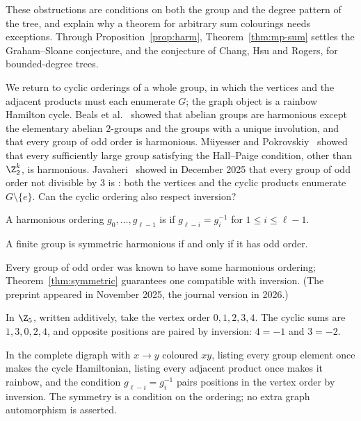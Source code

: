 These obstructions are conditions on both the group and the degree pattern of the tree, and explain why a theorem for arbitrary sum colourings needs exceptions. Through Proposition~\ref{prop:harm}, Theorem~\ref{thm:mp-sum} settles the Graham--Sloane conjecture, and the conjecture of Chang, Hsu and Rogers, for bounded-degree trees.


We return to cyclic orderings of a whole group, in which the vertices and the adjacent products must each enumerate $G$; the graph object is a rainbow Hamilton cycle. Beals et al.~\cite{bghj91} showed that abelian groups are harmonious except the elementary abelian $2$-groups and the groups with a unique involution, and that every group of odd order is harmonious. M\"uyesser and Pokrovskiy~\cite{mp22} showed that every sufficiently large group satisfying the Hall--Paige condition, other than $\Z_2^k$, is harmonious. Javaheri~\cite{jav25} showed in December 2025 that every group of odd order not divisible by $3$ is : both the vertices and the cyclic products enumerate $G\setminus\{e\}$. Can the cyclic ordering also respect inversion?

\begin{definition}\label{def:symmetric}
A harmonious ordering $g_0,\dots,g_{\ell-1}$ is  if $g_{\ell-i}=g_i^{-1}$ for $1\leq i\leq\ell-1$.
\end{definition}

\begin{theorem}\label{thm:symmetric}
A finite group is symmetric harmonious if and only if it has odd order.
\end{theorem}

Every group of odd order was known to have some harmonious ordering; Theorem~\ref{thm:symmetric} guarantees one compatible with inversion. (The preprint appeared in November 2025, the journal version in 2026.)

\begin{example}\label{ex:z5-symmetric}
In $\Z_5$, written additively, take the vertex order $0,1,2,3,4$. The cyclic sums are $1,3,0,2,4$, and opposite positions are paired by inversion: $4=-1$ and $3=-2$.
\end{example}

In the complete digraph with $x\to y$ coloured $xy$, listing every group element once makes the cycle Hamiltonian, listing every adjacent product once makes it rainbow, and the condition $g_{\ell-i}=g_i^{-1}$ pairs positions in the vertex order by inversion. The symmetry is a condition on the ordering; no extra graph automorphism is asserted.

